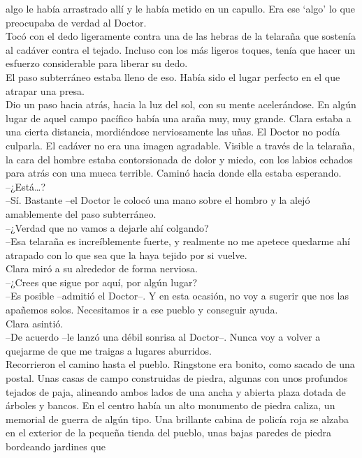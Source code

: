 {algo le había arrastrado allí y le había metido en un capullo. Era ese
`algo' lo que preocupaba de verdad al Doctor.\\
Tocó con el dedo ligeramente contra una de las hebras de la telaraña que
sostenía al cadáver contra el tejado. Incluso con los más ligeros
toques, tenía que hacer un esfuerzo considerable para liberar su dedo.\\
El paso subterráneo estaba lleno de eso. Había sido el lugar perfecto en
el que atrapar una presa.\\
Dio un paso hacia atrás, hacia la luz del sol, con su mente
acelerándose. En algún lugar de aquel campo pacífico había una araña
muy, muy grande. Clara estaba a una cierta distancia, mordiéndose
nerviosamente las uñas. El Doctor no podía culparla. El cadáver no era
una imagen agradable. Visible a través de la telaraña, la cara del
hombre estaba contorsionada de dolor y miedo, con los labios echados
para atrás con una mueca terrible. Caminó hacia donde ella estaba
esperando.\\
--¿Está\ldots{}?\\
--Sí. Bastante --el Doctor le colocó una mano sobre el hombro y la alejó
amablemente del paso subterráneo.\\
--¿Verdad que no vamos a dejarle ahí colgando?\\
--Esa telaraña es increíblemente fuerte, y realmente no me apetece
quedarme ahí atrapado con lo que sea que la haya tejido por si vuelve.\\
Clara miró a su alrededor de forma nerviosa.\\
--¿Crees que sigue por aquí, por algún lugar?\\
--Es posible --admitió el Doctor--. Y en esta ocasión, no voy a sugerir
que nos las apañemos solos. Necesitamos ir a ese pueblo y conseguir
ayuda.\\
Clara asintió.\\
--De acuerdo --le lanzó una débil sonrisa al Doctor--. Nunca voy a
volver a quejarme de que me traigas a lugares aburridos.\\
Recorrieron el camino hasta el pueblo. Ringstone era bonito, como sacado
de una postal. Unas casas de campo construidas de piedra, algunas con
unos profundos tejados de paja, alineando ambos lados de una ancha y
abierta plaza dotada de árboles y bancos. En el centro había un alto
monumento de piedra caliza, un memorial de guerra de algún tipo. Una
brillante cabina de policía roja se alzaba en el exterior de la pequeña
tienda del pueblo, unas bajas paredes de piedra bordeando jardines que
}
